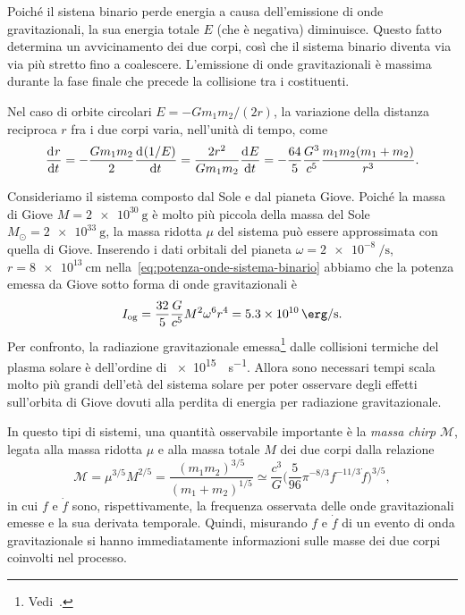 Poiché il sistena binario perde energia a causa dell'emissione di onde
gravitazionali, la sua energia totale $E$ (che è negativa) diminuisce.  Questo
fatto determina un avvicinamento dei due corpi, così che il sistema binario
diventa via via più stretto fino a coalescere.  L'emissione di onde
gravitazionali è massima durante la fase finale che precede la collisione tra i
costituenti.

Nel caso di orbite circolari $E = -Gm_{1}m_{2}/(2r)$, la variazione della
distanza reciproca $r$ fra i due corpi varia, nell'unità di tempo, come
\begin{equation}
  \frac{{\mathop{}\!\mathrm{d}^{}}r}{\mathop{}\!\mathrm{d} {t}^{}} = -\frac{Gm_{1}m_{2}}{2} \frac{{\mathop{}\!\mathrm{d}^{}}(1/E)}{\mathop{}\!\mathrm{d} {t}^{}} =
  \frac{2r^{2}}{Gm_{1}m_{2}} \frac{{\mathop{}\!\mathrm{d}^{}}E}{\mathop{}\!\mathrm{d} {t}^{}} = -\frac{64}{5}\frac{G^{3}}{c^{5}}
  \frac{m_{1}m_{2}(m_{1} + m_{2})}{r^{3}}.
\end{equation}

Consideriamo il sistema composto dal Sole e dal pianeta Giove.  Poiché la massa
di Giove $M = \SI{2e30}{\gram}$ è molto più piccola della massa del Sole
$M_{\odot} = \SI{2e33}{\gram}$, la massa ridotta $\mu$ del sistema può essere
approssimata con quella di Giove.  Inserendo i dati orbitali del pianeta
$\omega = \SI[per-mode=reciprocal]{2e-8}{\per\second}$,
$r = \SI{8e13}{\centi\metre}$ nella~\eqref{eq:potenza-onde-sistema-binario}
abbiamo che la potenza emessa da Giove sotto forma di onde gravitazionali è
\begin{equation}
  I_{\textup{og}} = \frac{32}{5} \frac{G}{c^{5}} M^{2} \omega^{6} r^{4} =
  \SI{5.3e10}{\erg\per\second}.
\end{equation}
Per confronto, la radiazione gravitazionale
emessa\footnote{Vedi~\textcite[266]{weinberg:gravitation}.}  dalle collisioni
termiche del plasma solare è dell'ordine di \SI{e15}{\erg\per\second}.  Allora
sono necessari tempi scala molto più grandi dell'età del sistema solare per
poter osservare degli effetti sull'orbita di Giove dovuti alla perdita di
energia per radiazione gravitazionale.

In questo tipi di sistemi, una quantità osservabile importante è la \emph{massa
  chirp} \(\mathcal{M}\), legata alla massa ridotta \(\mu\) e alla massa totale
\(M\) dei due corpi dalla relazione
\begin{equation}
  \mathcal{M} = \mu^{3/5} M^{2/5} = \frac{(m_{1} m_{2})^{3/5}}{(m_{1} +
    m_{2})^{1/5}} \simeq \frac{c^{3}}{G} \biggl(\frac{5}{96} \pi^{-8/3}
  f^{-11/3} \dot{f}\biggr)^{3/5},
\end{equation}
in cui \(f\) e \(\dot{f}\) sono, rispettivamente, la frequenza osservata delle
onde gravitazionali emesse e la sua derivata temporale.  Quindi, misurando \(f\)
e \(\dot{f}\) di un evento di onda gravitazionale si hanno immediatamente
informazioni sulle masse dei due corpi coinvolti nel processo.

